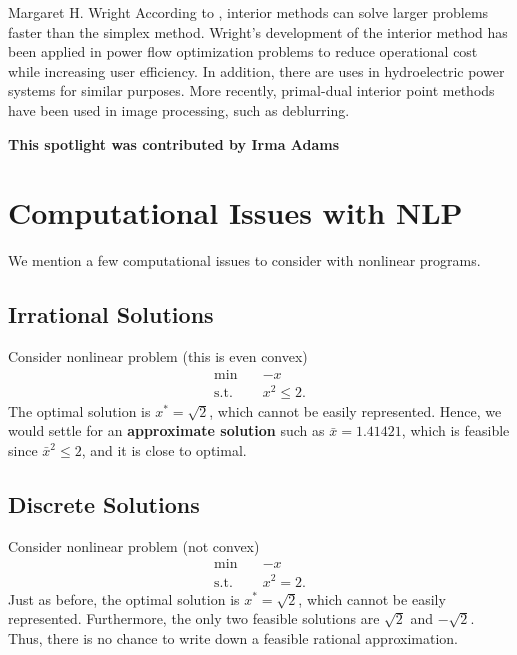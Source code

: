 \begin{refsection}
\begin{pioneerspotlight}{Margaret H. Wright}
According to \textcite{lauterio_2022_interiorpoint}, interior methods can solve larger problems faster than the simplex method. Wright’s development of the interior method has been applied in power flow optimization problems to reduce operational cost while increasing user efficiency. In addition, there are uses in hydroelectric power systems for similar purposes. More recently, primal-dual interior point methods have been used in image processing, such as deblurring. 

\begin{center}
{\small \textbf{This spotlight was contributed by Irma Adams}}
\end{center}
\printbibliography[heading=subbibliography]
\end{pioneerspotlight}
\end{refsection}


\chapter{Computational Issues with NLP}
We mention a few computational issues to consider with nonlinear programs.  
\section{Irrational Solutions}
Consider nonlinear problem (this  is even convex)
\begin{equation}
\begin{array}{rl}
\min \quad & -x\\
\text{s.t.} \quad & x^2 \leq 2.
\end{array}
\end{equation}
The optimal solution is $x^* = \sqrt{2}$, which cannot be easily represented.  Hence, we would settle for an \textbf{approximate solution} such as $\bar x = 1.41421$, which is feasible since $\bar x^2 \leq 2$, and it is close to optimal.

\section{Discrete Solutions}
Consider nonlinear problem (not convex)
\begin{equation}
\begin{array}{rl}
\min \quad & -x\\
\text{s.t.} \quad & x^2 = 2.
\end{array}
\end{equation}
Just as before, the optimal solution is $x^* = \sqrt{2}$, which cannot be easily represented.  Furthermore, the only two feasible solutions are $\sqrt{2}$ and $-\sqrt{2}$.  Thus, there is no chance to write down a feasible rational approximation.

